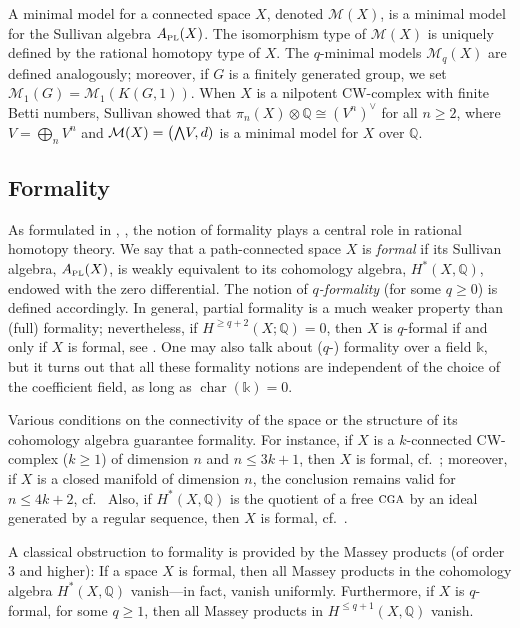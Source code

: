 \documentclass{article}
\numberwithin{equation}{section}
\theoremstyle{definition}
\newcommand{\Q}{\mathbb{Q}}
\renewcommand{\k}{\mathbb{k}}
\newcommand{\M}{\mathcal{M}}
\newcommand{\cga}{\ensuremath{\textsc{cga}}}
\DeclareMathOperator{\ch}{char}
\newcommand{\apl}{A_{\scriptscriptstyle{{\rm PL}}}}
\newcommand{\bwedge}{\mbox{\normalsize $\bigwedge$}}
\begin{document}
A minimal model for a connected space $X$, denoted $\M(X)$, is a 
minimal model for the Sullivan algebra $\apl(X)$. The isomorphism 
type of $\M(X)$ is uniquely defined by the rational homotopy type of $X$. 
The $q$-minimal models $\M_q(X)$ are defined analogously; moreover, 
if $G$ is a finitely generated group, we set $\M_1(G)=\M_1(K(G,1))$. 
When $X$ is a nilpotent CW-complex 
with finite Betti numbers, Sullivan \cite{Sullivan77} showed that 
$\pi_n(X)\otimes \Q\cong (V^n)^{\vee}$ for all $n\ge 2$, 
where $V=\bigoplus_{n} V^n$ and $\M(X)=\big( \bwedge V, d)$ is a 
minimal model for $X$ over $\Q$. 

\subsection{Formality}
\label{subsec:intro-formal}

As formulated in \cite{Sullivan77}, \cite{DGMS}, the notion of formality 
plays a central role in rational homotopy theory. 
We say that a path-connected space $X$ is {\em formal}\/ 
if its Sullivan algebra, $\apl(X)$, is weakly equivalent to 
its cohomology algebra, $H^*(X,\Q)$, endowed with the 
zero differential. The notion of {\em $q$-formality}\/ 
(for some $q\ge 0$) is defined accordingly. In general, 
partial formality is a much weaker property than (full) formality; 
nevertheless, if $H^{\ge q+2}(X;\Q)=0$, then $X$ is $q$-formal 
if and only if $X$ is formal, see \cite{Mc10}. One may also 
talk about ($q$-) formality over a field $\k$, 
but it turns out that all these formality notions are independent 
of the choice of the coefficient field, as long as $\ch(\k)=0$. 

Various conditions on the connectivity of the space or the structure 
of its cohomology algebra guarantee formality.  For instance, 
if $X$ is a $k$-connected CW-complex ($k\ge 1$) of dimension 
$n$ and $n \le 3k+1$, then $X$ is formal, cf.~\cite{Sta83}; 
moreover, if $X$ is a closed manifold of dimension $n$, the 
conclusion remains valid for $n \le 4k+2$, cf.~\cite{Mi79}
Also, if $H^*(X,\Q)$ is the quotient of a free $\cga$ by an ideal generated 
by a regular sequence, then $X$ is formal, cf.~\cite{Sullivan77}.  

A classical obstruction to formality is provided by the Massey products 
(of order $3$ and higher): If a space $X$ is formal, then all Massey 
products in the cohomology algebra $H^*(X,\Q)$ vanish---in fact, 
vanish uniformly. Furthermore, if $X$ is $q$-formal, for some 
$q\ge 1$, then all Massey products in $H^{\le q+1}(X,\Q)$ vanish.
\end{document}
